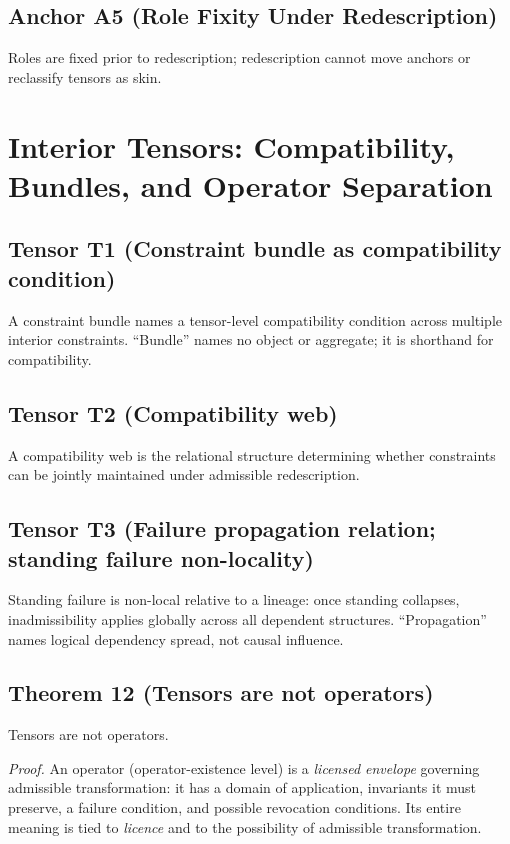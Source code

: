 \documentclass[12pt]{article}
\theoremstyle{plain}
\begin{document}
\subsection{Anchor A5 (Role Fixity Under Redescription)}

Roles are fixed prior to redescription; redescription cannot move anchors or reclassify tensors as skin.

\section{Interior Tensors: Compatibility, Bundles, and Operator Separation}

\subsection{Tensor T1 (Constraint bundle as compatibility condition)}

A constraint bundle names a tensor-level compatibility condition across multiple interior constraints. ``Bundle'' names no object or aggregate; it is shorthand for compatibility.

\subsection{Tensor T2 (Compatibility web)}

A compatibility web is the relational structure determining whether constraints can be jointly maintained under admissible redescription.

\subsection{Tensor T3 (Failure propagation relation; standing failure non-locality)}

Standing failure is non-local relative to a lineage: once standing collapses, inadmissibility applies globally across all dependent structures. ``Propagation'' names logical dependency spread, not causal influence.

\subsection{Theorem 12 (Tensors are not operators)}

Tensors are not operators.

\textit{Proof.} An operator (operator-existence level) is a \emph{licensed envelope} governing admissible transformation: it has a domain of application, invariants it must preserve, a failure condition, and possible revocation conditions. Its entire meaning is tied to \emph{licence} and to the possibility of admissible transformation.
\end{document}
